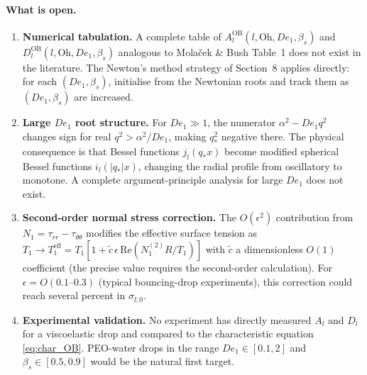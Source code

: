\paragraph{What is open.}
\begin{enumerate}
  \item \textbf{Numerical tabulation.} A complete table of
        $A_l^{\mathrm{OB}}(l,\mathrm{Oh},De_1,\beta_s)$ and
        $D_l^{\mathrm{OB}}(l,\mathrm{Oh},De_1,\beta_s)$ analogous to
        Mola\v{c}ek \& Bush Table~1 does not exist in the literature.
        The Newton's method strategy of Section~8 applies directly: for each
        $(De_1,\beta_s)$, initialise from the Newtonian roots and track them
        as $(De_1,\beta_s)$ are increased.
  \item \textbf{Large $De_1$ root structure.} For $De_1 \gg 1$, the numerator
        $\alpha^2 - De_1 q^2$ changes sign for real $q^2 > \alpha^2/De_1$,
        making $q_*^2$ negative there. The physical consequence is that
        Bessel functions $j_l(q_* x)$ become modified spherical Bessel
        functions $i_l(|q_*|x)$, changing the radial profile from
        oscillatory to monotone. A complete argument-principle analysis for
        large $De_1$ does not exist.
  \item \textbf{Second-order normal stress correction.} The $O(\epsilon^2)$
        contribution from $N_1 = \tau_{rr} - \tau_{\theta\theta}$ modifies
        the effective surface tension as
        $T_1 \to T_1^{\mathrm{eff}} = T_1\!\left[1 + \tilde{c}\,\epsilon\,\mathrm{Re}(N_1^{(2)}R/T_1)\right]$
        with $\tilde{c}$ a dimensionless $O(1)$ coefficient (the precise value
        requires the second-order calculation).
        For $\epsilon = O(0.1\text{--}0.3)$ (typical bouncing-drop
        experiments), this correction could reach several percent in $\sigma_{l;0}$.
  \item \textbf{Experimental validation.} No
        experiment has directly measured $A_l$ and $D_l$ for a viscoelastic
        drop and compared to the characteristic equation \eqref{eq:char_OB}.
        PEO-water drops in the range $De_1 \in [0.1, 2]$ and $\beta_s \in
        [0.5, 0.9]$ would be the natural first target.
\end{enumerate}

